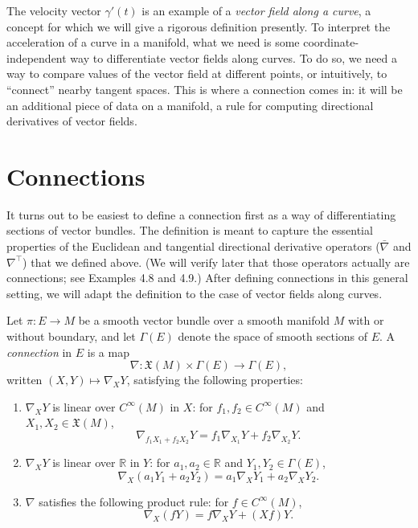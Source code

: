 The velocity vector $\gamma'(t)$ is an example of a \emph{vector field along a curve}, a concept for which we will give a rigorous definition presently. To interpret the acceleration of a curve in a manifold, what we need is some coordinate-independent way to differentiate vector fields along curves. To do so, we need a way to compare values of the vector field at different points, or intuitively, to ``connect'' nearby tangent spaces. This is where a connection comes in: it will be an additional piece of data on a manifold, a rule for computing directional derivatives of vector fields.

\section{Connections}

It turns out to be easiest to define a connection first as a way of differentiating sections of vector bundles. The definition is meant to capture the essential properties of the Euclidean and tangential directional derivative operators ($\bar\nabla$ and $\nabla^\top$) that we defined above. (We will verify later that those operators actually are connections; see Examples 4.8 and 4.9.) After defining connections in this general setting, we will adapt the definition to the case of vector fields along curves.

\begin{definition}[Connection]
\label{def:connection}
\leanok
Let $\pi : E \to M$ be a smooth vector bundle over a smooth manifold $M$ with or without boundary, and let $\Gamma(E)$ denote the space of smooth sections of $E$. A \emph{connection} in $E$ is a map
\[
\nabla: \mathfrak{X}(M) \times \Gamma(E) \to \Gamma(E),
\]
written $(X, Y) \mapsto \nabla_X Y$, satisfying the following properties:
\begin{enumerate}
\item[(i)] $\nabla_X Y$ is linear over $C^\infty(M)$ in $X$: for $f_1, f_2 \in C^\infty(M)$ and $X_1, X_2 \in \mathfrak{X}(M)$,
\[
\nabla_{f_1 X_1 + f_2 X_2} Y = f_1 \nabla_{X_1} Y + f_2 \nabla_{X_2} Y.
\]

\item[(ii)] $\nabla_X Y$ is linear over $\mathbb{R}$ in $Y$: for $a_1, a_2 \in \mathbb{R}$ and $Y_1, Y_2 \in \Gamma(E)$,
\[
\nabla_X(a_1 Y_1 + a_2 Y_2) = a_1 \nabla_X Y_1 + a_2 \nabla_X Y_2.
\]

\item[(iii)] $\nabla$ satisfies the following product rule: for $f \in C^\infty(M)$,
\[
\nabla_X(fY) = f \nabla_X Y + (Xf)Y.
\]
\end{enumerate}
\end{definition}

